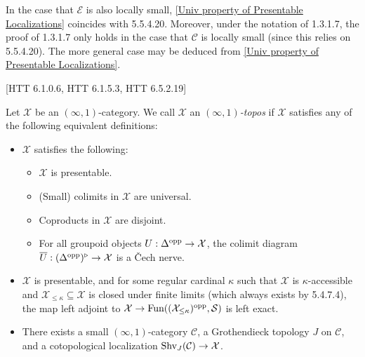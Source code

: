 \documentclass[10pt]{article}
\newcommand{\mS}{\mathcal S}
\newcommand{\C}{\mathcal C}
\newcommand{\cE}{\mathcal{E}}
\newcommand{\cX}{\mathcal{X}}
\theoremstyle{witharg}
\theoremstyle{witharg}
\theoremstyle{witharg2}
\begin{document}
\begin{remark}{}\label{Small error in 1.3.1.7}

     In the case that $\cE$ is also locally small, \ref{Univ property of Presentable Localizations} coincides with  5.5.4.20. Moreover, under the notation of  1.3.1.7, the proof of  1.3.1.7 only holds in the case that $\C$ is locally small (since this relies on  5.5.4.20). The more general case may be deduced from \ref{Univ property of Presentable Localizations}.
    
\end{remark}


\begin{definition}{}[HTT 6.1.0.6, HTT 6.1.5.3, HTT 6.5.2.19]\label{Defn of an Inf Topos}

    Let $\cX$ be an $(\infty,1)$-category. We call $\cX$ an \emph{$(\infty,1)$-topos} if $\cX$ satisfies any of the following equivalent definitions: 

    \begin{itemize}
    
        \item [$(1)$] $\cX$ satisfies the following:
        
        \begin{itemize}
             \item [$(a)$] $\cX$ is presentable. 

            \item [$(b)$] (Small) colimits in $\cX$ are universal. 

            \item [$(c)$] Coproducts in $\cX$ are disjoint. 

            \item [$(d)$] For all groupoid objects $U:\Delta^{\textnormal{opp}}\rightarrow \cX$, the colimit diagram $\overline{U}:(\Delta^{\textnormal{opp}})^\triangleright\rightarrow \cX$ is a \v{C}ech nerve.
        \end{itemize}

        \item [$(2)$] $\cX$ is presentable, and for some regular cardinal $\kappa$ such that $\cX$ is $\kappa$-accessible and $\cX_{\leq \kappa}\subseteq \cX$ is closed under finite limits (which always exists by  5.4.7.4), the map left adjoint to $\cX\rightarrow \textnormal{Fun}((\cX_{\leq \kappa})^\textnormal{opp},\mS)$ is left exact. 

        \item [$(3)$] There exists a small $(\infty,1)$-category $\C$, a Grothendieck topology $J$ on $\C$, and a cotopological localization $\textnormal{Shv}_J(\C)\rightarrow \cX$. 
    
        
    \end{itemize}
    
\end{definition}
\end{document}
